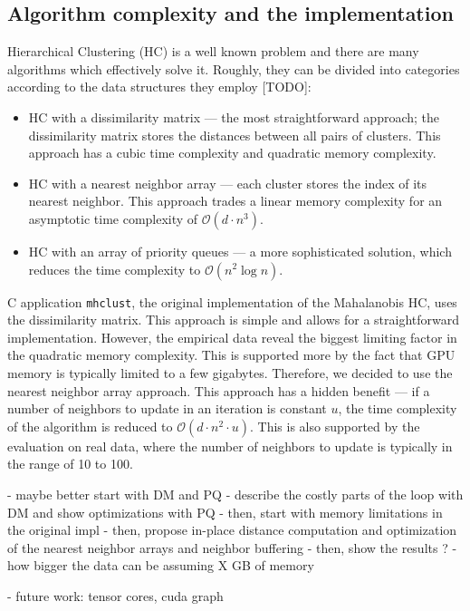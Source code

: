 \subsection{Algorithm complexity and the implementation}

Hierarchical Clustering (HC) is a well known problem and there are many algorithms which effectively solve it. Roughly, they can be divided into categories according to the data structures they employ [TODO]:
\begin{itemize}
    \item HC with a dissimilarity matrix --- the most straightforward approach; the dissimilarity matrix stores the distances between all pairs of clusters. This approach has a cubic time complexity and quadratic memory complexity.
    \item HC with a nearest neighbor array --- each cluster stores the index of its nearest neighbor. This approach trades a linear memory complexity for an asymptotic time complexity of $\mathcal{O}(d \cdot n^3)$.
    \item HC with an array of priority queues --- a more sophisticated solution, which reduces the time complexity to $\mathcal{O}(n^2 \log n)$.
\end{itemize}

C application \texttt{mhclust}, the original implementation of the Mahalanobis HC, uses the dissimilarity matrix. This approach is simple and allows for a straightforward implementation. However, the empirical data reveal the biggest limiting factor in the quadratic memory complexity. This is supported more by the fact that GPU memory is typically limited to a few gigabytes. Therefore, we decided to use the nearest neighbor array approach. This approach has a hidden benefit --- if a number of neighbors to update in an iteration is constant $u$, the time complexity of the algorithm is reduced to $\mathcal{O}(d \cdot n^2 \cdot u)$. This is also supported by the evaluation on real data, where the number of neighbors to update is typically in the range of 10 to 100. 

- maybe better start with DM and PQ - describe the costly parts of the loop with DM and show optimizations with PQ
- then, start with memory limitations in the original impl
- then, propose in-place distance computation and optimization of the nearest neighbor arrays and neighbor buffering
- then, show the results ? - how bigger the data can be assuming X GB of memory

- future work: tensor cores, cuda graph


